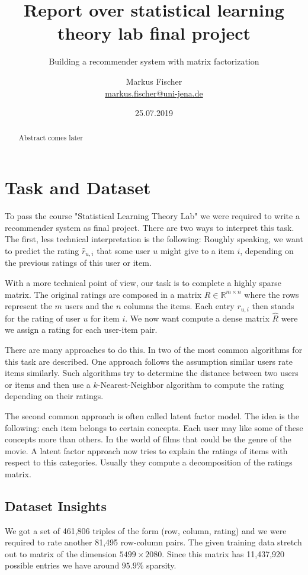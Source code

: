 \documentclass[DIV=14,twocolumn]{scrartcl}
\title{Report over statistical learning theory lab final project}
\subtitle{Building a recommender system with matrix factorization}
\author{Markus Fischer\\ \small{\href{mailto:markus.fischer@uni-jena.de}{markus.fischer@uni-jena.de}}}
\date{25.07.2019}
\begin{document}
\maketitle
\begin{abstract}
Abstract comes later
\end{abstract}

\section{Task and Dataset}\label{intro}
To pass the course "Statistical Learning Theory Lab" we were required to write a recommender system as final project. There are two ways to interpret this task.
The first, less technical interpretation is the following: Roughly speaking, we want to predict the rating $\hat{r}_{u,i}$ that some user $u$ might give to a item $i$, depending on the previous ratings of this user or item.

With a more technical point of view, our task is to complete a highly sparse matrix. The original ratings are composed in a matrix $R\in\mathbb{R}^{m\times n}$ where the rows represent the $m$ users and the $n$ columns the items.
Each entry $r_{u,i}$ then stands for the rating of user $u$ for item $i$. We now want compute a dense matrix $\hat{R}$ were we assign a rating for each user-item pair.

There are many approaches to do this. In \cite{KoBeVo09} two of the most common algorithms for this task are described.
One approach follows the assumption similar users rate items similarly. Such algorithms try to determine the distance between two users or items and then use a $k$-Nearest-Neighbor algorithm to compute the rating depending on their ratings.

The second common approach is often called latent factor model. The idea is the following: each item belongs to certain concepts. Each user may like some of these concepts more than others. In the world of films that could be the genre of the movie. A latent factor approach now tries to explain the ratings of items with respect to this categories. Usually they compute a decomposition of the ratings matrix.

\subsection{Dataset Insights}\label{datsetinsight}
We got a set of 461,806 triples of the form (row, column, rating) and we were required to rate another 81,495 row-column pairs. 
The given training data stretch out to matrix of the dimension $5499\times 2080$. Since this matrix has 11,437,920 possible entries we have around $95.9\%$ sparsity.
\end{document}
